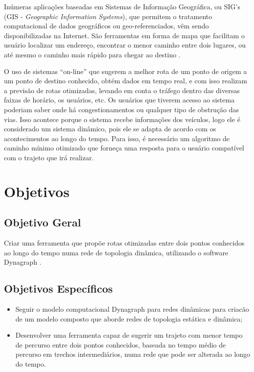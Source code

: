 Inúmeras aplicações baseadas em Sistemas de Informação Geográfica, ou SIG’s (GIS - \textit{Geographic Information Systems}),
que permitem o tratamento computacional de dados geográficos ou geo-referenciados,
vêm sendo disponibilizadas na Internet.
São ferramentas em forma de mapa que facilitam o usuário localizar um endereço,
encontrar o menor caminho entre dois lugares, ou até mesmo o caminho mais rápido para chegar ao destino \cite{leonard}.

O uso de sistemas ``on-line'' que sugerem a melhor rota de um ponto de origem a um ponto de destino conhecido,
obtém dados em tempo real, e com isso realizam a previsão de rotas otimizadas, levando em conta o tráfego
dentro das diversas faixas de horário, os usuários, etc.
Os usuários que tiverem acesso ao sistema poderiam saber onde há congestionamentos ou qualquer tipo de obstrução das vias.
Isso acontece porque o sistema recebe informações dos veículos, logo ele é considerado um sistema dinâmico,
pois ele se adapta de acordo com os acontecimentos ao longo do tempo.
Para isso, é necessário um algoritmo de caminho mínimo otimizado que forneça uma resposta para o usuário compatível
com o trajeto que irá realizar.

\section{Objetivos}

\subsection{Objetivo Geral}
Criar uma ferramenta que propõe rotas otimizadas entre dois pontos conhecidos ao longo do tempo
numa rede de topologia dinâmica, utilizando o software Dynagraph \cite{dynagraph}.

\subsection{Objetivos Específicos}
\begin{itemize}
 \item Seguir o modelo computacional Dynagraph \cite{dynagraph} para redes dinâmicas para criacão de um modelo composto
 que aborde redes de topologia estática e dinâmica;
 \item Desenvolver uma ferramenta capaz de sugerir um trajeto com menor tempo
 de percurso entre dois pontos conhecidos, baseada no tempo médio de percurso em trechos
 intermediários, numa rede que pode ser alterada ao longo do tempo.
\end{itemize}

